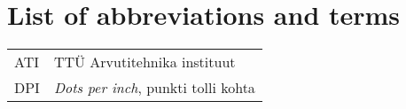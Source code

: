 \section*{\centering List of abbreviations and terms}

\begin{tabular}{p{3cm}p{11cm}}
  ATI&TTÜ Arvutitehnika instituut\\
  DPI&\textit{Dots per inch}, punkti tolli kohta

\end{tabular}
\pagebreak
